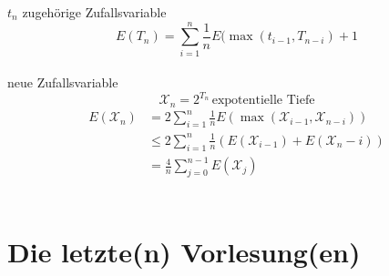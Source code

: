 \documentclass[a4paper,twoside,10pt]{report}
\begin{document}
{$t_n$ zugehörige Zufallsvariable
\[E(T_n)=\sum_{i=1}^n \frac{1}{n}E(\max(t_{i-1},T_{n-i})+1\]
\\[.5em]
neue Zufallsvariable
\[\mathcal X_n=2^{T_n} \,\mbox{expotentielle Tiefe}\]
\begin{align*}
E(\mathcal X_n)&=2\sum_{i=1}^n\frac{1}{n}E(\max(\mathcal X_{i-1},\mathcal X_{n-i}))\\
&\le 2\sum_{i=1}^n\frac{1}{n}(E(\mathcal X_{i-1})+E(\mathcal X_n-i))\\
&=\frac{4}{n}\sum_{j=0}^{n-1}E(\mathcal X_j)
\end{align*}
\\[.5em]


























































\part{Die letzte(n) Vorlesung(en)}
}
\end{document}
